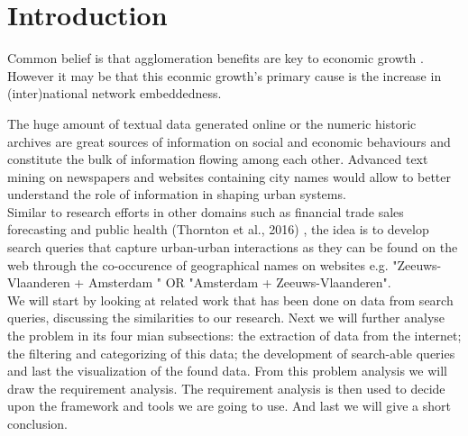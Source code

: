 \section{Introduction}



Common belief is that agglomeration benefits are key to economic growth \cite{porter2000location}. 
However it may be that this econmic growth's primary cause is the increase in (inter)national network embeddedness. 

The huge amount of textual data generated online or the numeric historic archives are great sources of information on social and economic behaviours and constitute the bulk of information flowing among each other. Advanced text mining on newspapers and websites containing city names would allow to better understand the role of information in shaping urban systems. \\
Similar to research efforts in other domains such as financial trade \cite{preis2013quantifying} sales forecasting \cite{wu2014future} and public health (Thornton et al., 2016) \cite{?}, the idea is to develop search queries that capture urban-urban interactions as they can be found on the web through the co-occurence of geographical names on websites e.g. "Zeeuws-Vlaanderen + Amsterdam " OR "Amsterdam + Zeeuws-Vlaanderen". \\

We will start by looking at related work that has been done on data from search queries, discussing the similarities to our research. Next we will further analyse the problem in its four mian subsections: the extraction of data from the internet; the filtering and categorizing of this data; the development of search-able queries and last the visualization of the found data. From this problem analysis we will draw the requirement analysis. The requirement analysis is then used to decide upon the framework and tools we are going to use. And last we will give a short conclusion.